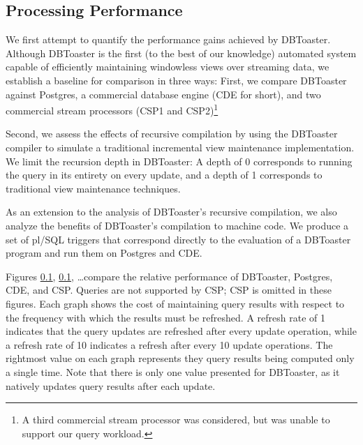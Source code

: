 \subsection{Processing Performance}
We first attempt to quantify the performance gains achieved by DBToaster.  Although DBToaster is the first (to the best of our knowledge) automated system capable of efficiently maintaining windowless views over streaming data, we establish a baseline for comparison in three ways: First, we compare DBToaster against Postgres, a commercial database engine (CDE for short), and two commercial stream processors (CSP1 and CSP2)\footnote{A third commercial stream processor was considered, but was unable to support our query workload.  }

Second, we assess the effects of recursive compilation by using the DBToaster compiler to simulate a traditional incremental view maintenance implementation.  We limit the recursion depth in DBToaster: A depth of 0 corresponds to running the query in its entirety on every update, and a depth of 1 corresponds to traditional view maintenance techniques.  

As an extension to the analysis of DBToaster's recursive compilation, we also analyze the benefits of DBToaster's compilation to machine code.  We produce a set of pl/SQL triggers that correspond directly to the evaluation of a DBToaster program and run them on Postgres and CDE.

Figures \ref{}, \ref{}, \ldots compare the relative performance of DBToaster, Postgres, CDE, and CSP.  Queries  are not supported by CSP; CSP is omitted in these figures.  Each graph shows the cost of maintaining query results with respect to the frequency with which the results must be refreshed.  A refresh rate of 1 indicates that the query updates are refreshed after every update operation, while a refresh rate of 10 indicates a refresh after every 10 update operations.  The rightmost value on each graph represents they query results being computed only a single time.  Note that there is only one value presented for DBToaster, as it natively updates query results after each update.


